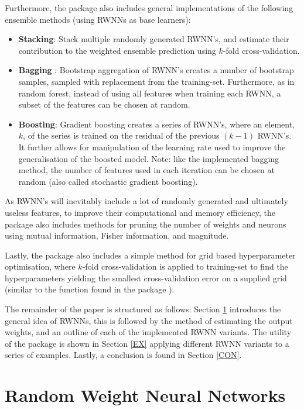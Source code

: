 \documentclass[
]{jss}
\providecommand{\tightlist}{%
  \setlength{\itemsep}{0pt}\setlength{\parskip}{0pt}}
\begin{document}
Furthermore, the  package also includes general
implementations of the following ensemble methods (using RWNNs as base
learners):

\begin{itemize}
\tightlist
\item
  \textbf{Stacking}: Stack multiple randomly generated RWNN's, and
  estimate their contribution to the weighted ensemble prediction using
  \(k\)-fold cross-validation.
\item
  \textbf{Bagging} \citep{Xin2021}: Bootstrap aggregation of RWNN's
  creates a number of bootstrap samples, sampled with replacement from
  the training-set. Furthermore, as in random forest, instead of using
  all features when training each RWNN, a subset of the features can be
  chosen at random.
\item
  \textbf{Boosting}: Gradient boosting creates a series of RWNN's, where
  an element, \(k\), of the series is trained on the residual of the
  previous \((k - 1)\) RWNN's. It further allows for manipulation of the
  learning rate used to improve the generalisation of the boosted model.
  Note: like the implemented bagging method, the number of features used
  in each iteration can be chosen at random (also called stochastic
  gradient boosting).
\end{itemize}

As RWNN's will inevitably include a lot of randomly generated and
ultimately useless features, to improve their computational and memory
efficiency, the  package also includes methods for pruning the
number of weights and neurons using mutual information, Fisher
information, and magnitude.

Lastly, the  package also includes a simple method for grid
based hyperparameter optimisation, where \(k\)-fold cross-validation is
applied to training-set to find the hyperparameters yielding the
smallest cross-validation error on a supplied grid (similar to the
 function found in the package ).

The remainder of the paper is structured as follows: Section \ref{RWNN}
introduces the general idea of RWNNs, this is followed by the method of
estimating the output weights, and an outline of each of the implemented
RWNN variants. The utility of the  package is shown in Section
\ref{EX} applying different RWNN variants to a series of examples.
Lastly, a conclusion is found in Section \ref{CON}.

\hypertarget{RWNN}{%
\section{Random Weight Neural Networks}\label{RWNN}}
\end{document}
